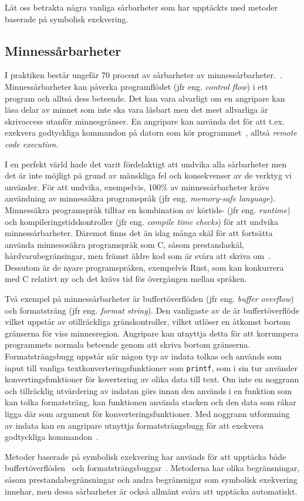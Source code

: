 Låt oss betrakta några vanliga sårbarheter som har upptäckts med metoder
baserade på symbolisk exekvering.

\subsection{Minnessårbarheter}
I praktiken består ungefär 70 procent av sårbarheter av
minnessårbarheter.~\cite{miller19}. Minnessårbarheter kan påverka programflödet
(jfr eng. \emph{control flow}) i ett program och alltså dess beteende. Det kan
vara alvarligt om en angripare kan läsa delar av minnet som inte ska vara
läsbart men det mest allvarliga är skrivaccess utanför minnesgränser. En
angripare kan använda det för att t.ex. exekvera godtyckliga kommandon på
datorn som kör programmet~\cite{computer_security_cs161}, alltså \emph{remote
    code execution}.

I en perfekt värld hade det varit fördelaktigt att undvika alla sårbarheter men
det är inte möjligt på grund av mänskliga fel och konsekvenser av de verktyg vi
använder. För att undvika, exempelvis, 100\% av minnessårbarheter krävs
användning av minnessäkra programspråk (jfr eng. \emph{memory-safe language}).
Minnessäkra programspråk tilltar en kombination av körtids- (jfr eng.
\emph{runtime}) och kompileringstidskontroller (jfr eng. \emph{compile
    time checks}) för att undvika minnessårbarheter. Däremot finns det än idag
många skäl för att fortsätta använda minnesosäkra programspråk som C, såsom
prestandaskäl, hårdvarubegränsingar, men främst äldre kod som är svåra att
skriva om~\cite{computer_security_cs161}. Dessutom är de nyare programspråken,
exempelvis Rust, som kan konkurrera med C relativt ny och det krävs tid för
övergången mellan språken.

Två exempel på minnessårbarheter är buffertöverflöden (jfr eng. \emph{buffer
    overflow}) och formatsträng (jfr eng. \emph{format string}). Den
vanligaste av de är buffertöverflöde vilket uppstår av otillräckliga
gränskontroller, vilket utlöser en åtkomst bortom gränserna för viss
minnesregion. Angripare kan utnyttja detta för att korrumpera programmets
normala beteende genom att skriva bortom gränserna. Formatsträngsbugg uppstår
när någon typ av indata tolkas och används som input till vanliga
textkonverteringsfunktioner som \texttt{printf}, som i sin tur använder
konvertingsfunktioner för kovertering av olika data till text. Om inte en
noggrann och tillräcklig utvärdering av indatan görs innan den används i en
funktion som kan tolka formatsträng, kan funktionen använda stacken och den
data som råkar ligga där som argument för konverteringsfunktioner. Med noggrann
utformning av indata kan en angripare utnyttja formatsträngsbugg för att
exekvera godtyckliga kommandon~\cite{computer_security_cs161}.

Metoder baserade på symbolisk exekvering har används för att upptäcka både
buffertöverflöden~\cite{bofaeg} och formatsträngsbuggar~\cite{vakkaupad15}.
Metoderna har olika begränsningar, såsom prestandabegränsningar och andra
begränsnigar som symbolisk exekvering innehar, men dessa sårbarheter är också
allmänt svåra att upptäcka automatiskt.
